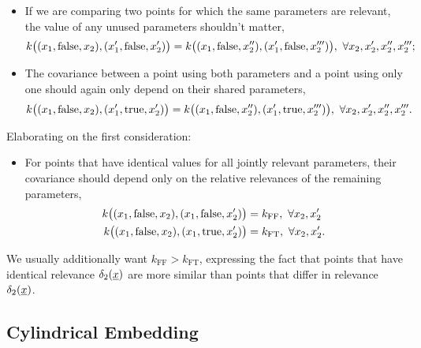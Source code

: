 \documentclass{article}
\newcommand{\vect}[1]{\underline{\smash{#1}}}
\renewcommand{\v}[1]{\vect{#1}}
\begin{document}
\begin{itemize}
\item If we are comparing two points for which the same parameters are relevant, the value of any unused parameters shouldn't matter,  
\begin{equation}
 k\bigl((x_1, \textnormal{false}, x_2), (x_1', \textnormal{false}, x_2') \bigr)
= k\bigl((x_1, \textnormal{false}, x_2''), (x_1', \textnormal{false}, x_2''')\bigr),\ 
\forall x_2, x_2', x_2'', x_2''';
\end{equation}
\item The covariance between a point using both parameters and a point using only one should again only depend on their shared parameters,
\begin{equation}
 k\bigl((x_1, \textnormal{false}, x_2), (x_1', \textnormal{true}, x_2') \bigr)
= k\bigl((x_1, \textnormal{false}, x_2''), (x_1', \textnormal{true}, x_2''')\bigr),\ 
\forall x_2, x_2', x_2'', x_2'''.
\end{equation}
\end{itemize}

Elaborating on the first consideration:

\begin{itemize}
\item For points that have identical values for all jointly relevant parameters, their covariance should depend only on the relative relevances of the remaining parameters,
\begin{align}
 k\bigl((x_1, \textnormal{false}, x_2), (x_1, \textnormal{false}, x_2') \bigr)
& = k_{\text{FF}},\ \forall x_2, x_2'\\
 k\bigl((x_1, \textnormal{false}, x_2), (x_1, \textnormal{true}, x_2') \bigr)
& = k_{\text{FT}},\ \forall x_2, x_2'.
\end{align}
\end{itemize}
We usually additionally want $k_{\text{FF}}>k_{\text{FT}}$, expressing the fact that points that have identical relevance $\delta_2({\v{x}})$ are more similar than points that differ in relevance $\delta_2({\v{x}})$.


\subsection{Cylindrical Embedding}
\end{document}
